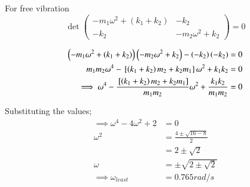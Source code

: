 \documentclass[journal,12pt,twocolumn]{IEEEtran}
\theoremstyle{remark}
\begin{document}
For free vibration 
\[
\det
\begin{pmatrix}
-m_1\omega^2+(k_1+k_2) & -k_2 \\
-k_2 & -m_2\omega^2+k_2
\end{pmatrix}
= 0
\]

\begin{align}
\left(-m_1\omega^2+(k_1+k_2)\right)\left(-m_2\omega^2+k_2\right)-\left(-k_2\right)\left(-k_2\right)&=0 \\
m_1m_2\omega ^4 -{}\left[\left(k_1+k_2\right)m_2+k_2m_1\right]\omega^2 +k_1k_2&=0\\
\implies \omega ^4 -\frac{{}\left[\left(k_1+k_2\right)m_2+k_2m_1\right]}{m_1m_2}\omega^2 +\frac{k_1k_2}{m_1m_2}&=0
\end{align}

Substituting the values;
\begin{align}
\implies \omega ^4 -4\omega^2 +2&=0 \\
\omega ^2 &= \frac{4\pm \sqrt{16-8}}{2}\\
&= 2\pm \sqrt{2}\\
 \omega &= \pm \sqrt{2\pm \sqrt{2}}\\
\implies \omega_{least} &= 0.765 rad/s
\end{align}
\end{document}

